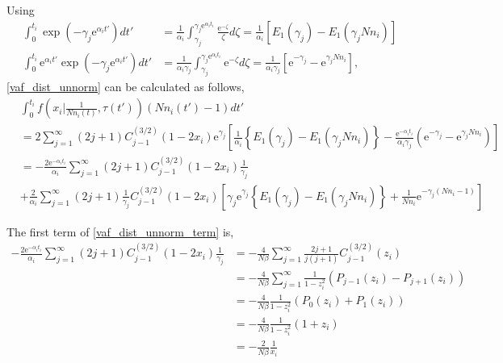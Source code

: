 \documentclass[12pt]{article}
\newcommand{\napier}{\mathrm{e}}
\begin{document}
Using
\begin{align}
 \int_{0}^{t_i} \exp(-\gamma_j \napier^{\alpha_i t'}) dt' & = \frac{1}{\alpha_i} \int_{\gamma_j}^{\gamma_j \napier^{\alpha_i t_i}} \frac{\napier^{-\zeta}}{\zeta} d\zeta = \frac{1}{\alpha_i} \left[ E_1(\gamma_j) - E_1(\gamma_j Nn_i) \right]\\
 \int_{0}^{t_i} \napier^{\alpha_i t'} \exp(-\gamma_j \napier^{\alpha_i t'}) dt' & = \frac{1}{\alpha_i \gamma_j} \int_{\gamma_j}^{\gamma_j \napier^{\alpha_i t_i}} \napier^{-\zeta} d\zeta = \frac{1}{\alpha_i \gamma_j} \left[ \napier^{-\gamma_j} - \napier^{\gamma_j Nn_i} \right],
\end{align}
\eqref{vaf_dist_unnorm} can be calculated as follows,
\begin{align}
 & \int_{0}^{t_i} f\left(x_i| \frac{1}{Nn_i(t)}, \tau(t')\right) (Nn_i(t')-1)  dt'\\
 & = 2 \sum_{j=1}^{\infty} (2j + 1) C^{(3/2)}_{j-1} (1-2x_i) \napier^{\gamma_j} \left[ \frac{1}{\alpha_i} \left\{ E_1(\gamma_j) - E_1(\gamma_j Nn_i) \right\} - \frac{\napier^{-\alpha_i t_i}}{\alpha_i \gamma_j} \left( \napier^{-\gamma_j} - \napier^{\gamma_j Nn_i} \right) \right]\\
 & = - \frac{2\napier^{-\alpha_i t_i}}{\alpha_i} \sum_{j=1}^{\infty} (2j+1) C^{(3/2)}_{j-1} (1-2x_i) \frac{1}{\gamma_j}\nonumber\\
 & + \frac{2}{\alpha_i} \sum_{j=1}^{\infty} (2j + 1) \frac{1}{\gamma_j} C^{(3/2)}_{j-1} (1-2x_i) \left[ \gamma_j \napier^{\gamma_j} \left\{ E_1(\gamma_j) - E_1(\gamma_j Nn_i) \right\} + \frac{1}{Nn_i} \napier^{-\gamma_j (Nn_i - 1)} \right]\label{vaf_dist_unnorm_term}
\end{align}

The first term of \eqref{vaf_dist_unnorm_term} is,
\begin{align}
 - \frac{2\napier^{-\alpha_i t_i}}{\alpha_i} \sum_{j=1}^{\infty} (2j+1) C^{(3/2)}_{j-1} (1-2x_i) \frac{1}{\gamma_j} & = - \frac{4}{N\beta} \sum_{j=1}^{\infty}\frac{2j+1}{j(j+1)} C^{(3/2)}_{j-1} (z_i)\\
 & = - \frac{4}{N\beta} \sum_{j=1}^{\infty} \frac{1}{1-z_i^2} \left(P_{j-1}(z_i) - P_{j+1}(z_i)\right)\\
 & = - \frac{4}{N\beta} \frac{1}{1-z_i^2} \left( P_{0}(z_i) + P_{1}(z_i) \right)\\
 & = - \frac{4}{N\beta} \frac{1}{1-z_i^2} \left(1 + z_i \right)\\
 & = - \frac{2}{N\beta} \frac{1}{x_i}
\end{align}
\end{document}
